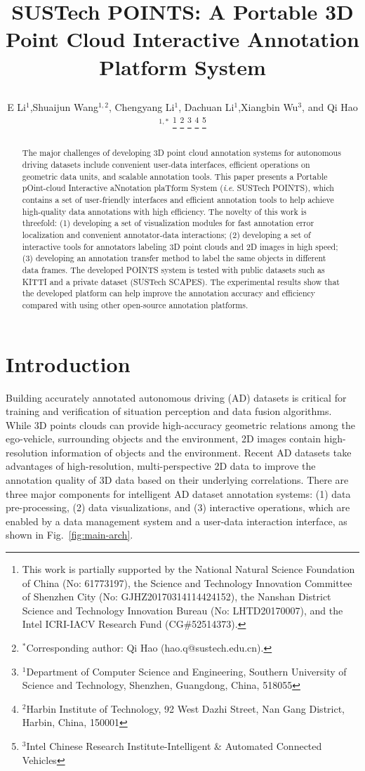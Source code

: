 \documentclass[letterpaper, 10 pt, conference]{ieeeconf}  %
\title{\LARGE \bf
SUSTech POINTS: A Portable 3D Point Cloud Interactive Annotation Platform System

}
\author{E Li$^{1}$,Shuaijun Wang$^{1,2}$,  Chengyang Li$^{1}$, Dachuan Li$^{1}$,Xiangbin Wu$^{3}$, and Qi Hao$^{1,*}$%
\thanks{This work is partially supported by the National Natural Science Foundation of China (No: 61773197), the Science and Technology Innovation Committee of Shenzhen City (No: GJHZ20170314114424152), the Nanshan District Science and Technology Innovation Bureau (No: LHTD20170007), and the Intel ICRI-IACV Research Fund (CG$\#$52514373).}
\thanks{$^{*}$Corresponding author: Qi Hao (hao.q@sustech.edu.cn).}
\thanks{$^{1}$Department of Computer Science and Engineering,
Southern University of Science and Technology, Shenzhen, Guangdong, China, 518055}
\thanks{$^{2}$Harbin Institute of Technology,
92 West Dazhi Street, Nan Gang District, Harbin, China, 150001}%
\thanks{$^{3}$Intel Chinese Research Institute-Intelligent \& Automated Connected Vehicles}%
}
\begin{document}
\maketitle
\thispagestyle{empty}
\pagestyle{empty}
\begin{abstract}

The major challenges of developing 3D point cloud annotation systems for autonomous driving datasets include
convenient user-data interfaces, efficient operations on geometric data units, and scalable annotation tools. 
This paper presents a {Portable pOint-cloud Interactive aNnotation plaTform System} (\textit{i}.\textit{e}. SUSTech POINTS), 
which contains a set of user-friendly interfaces and efficient annotation tools to help achieve high-quality data annotations with high efficiency. 
The novelty of this work is threefold: 
(1) developing a set of visualization modules for fast annotation error localization and convenient annotator-data interactions; 
(2) developing a set of interactive tools for annotators labeling 3D point clouds and 2D images in high speed;
(3) developing an annotation transfer method to label the same objects in different data frames. 
The developed POINTS system is tested with public datasets such as KITTI and a private dataset (SUSTech SCAPES). 
The experimental results show that the developed platform can help improve the annotation accuracy and efficiency 
compared with using other open-source annotation platforms.



\end{abstract}






\section{Introduction}


Building accurately annotated autonomous driving (AD) datasets is critical for training and verification of situation perception and data fusion algorithms. 
While 3D points clouds can provide high-accuracy geometric relations among the ego-vehicle, surrounding objects and the environment, 
2D images contain high-resolution information of objects and the environment. 
Recent AD datasets take advantages of high-resolution, multi-perspective 2D data to improve the annotation quality of 3D data 
based on their underlying correlations. 
There are three major components for intelligent AD dataset annotation systems: 
(1) data pre-processing, (2) data visualizations, and (3) interactive operations, 
which are enabled by a data management system and a user-data interaction interface, as shown in Fig.~\ref{fig:main-arch}.
\end{document}
